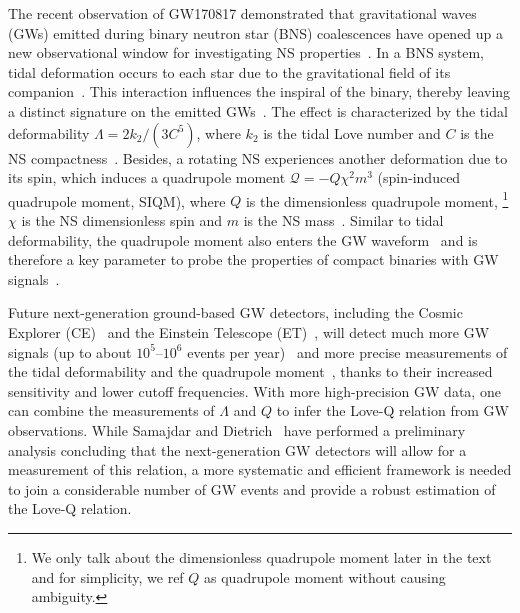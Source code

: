 \documentclass[a4paper,11pt]{article}
\begin{document}
The recent observation of GW170817 demonstrated that gravitational waves (GWs) emitted during binary neutron star (BNS) 
coalescences have opened up a new observational window for investigating NS properties~\cite{LIGOScientific:2017vwq, LIGOScientific:2018cki, LIGOScientific:2018hze}. 
In a BNS system, tidal deformation occurs to each star due to the gravitational field of its companion~\cite{Hinderer:2007mb, Damour:2009vw}. 
This interaction influences the inspiral of the binary, thereby leaving a distinct signature on the emitted GWs~\cite{Vines:2011ud, Favata:2013rwa, Wade:2014vqa, Baiotti:2019sew, Chatziioannou:2020pqz}.
The effect is characterized by the tidal deformability $\Lambda=2k_2/(3C^5)$, 
where $k_2$ is the tidal Love number and $C$ is the NS compactness~\cite{Flanagan:2007ix}. Besides, a rotating NS experiences another deformation due to its 
spin, which induces a quadrupole moment $\mathcal{Q}=-Q\chi^2 m^3$ (spin-induced quadrupole moment, SIQM), where $Q$ is the dimensionless quadrupole moment,
\footnote{We only talk about the dimensionless quadrupole moment later in the text and for simplicity, we ref $Q$ as quadrupole moment without causing ambiguity.} 
$\chi$ is the NS dimensionless spin and $m$ is the NS mass~\cite{Hartle:1968, Laarakkers:1997hb}. Similar to tidal deformability, the quadrupole moment also enters the 
GW waveform~\cite{Poisson:1997ha, Harry:2018hke, Samajdar:2019ulq, Abac:2023ujg} and is therefore a key parameter to probe the properties of compact binaries with GW signals~\cite{Agathos:2015uaa, Krishnendu:2017shb, Krishnendu:2019tjp, Lyu:2023zxv}. 

Future next-generation ground-based GW detectors, including the Cosmic Explorer (CE)~\cite{Reitze:2019iox, Reitze:2019dyk} and the Einstein Telescope (ET)~\cite{Punturo:2010zz, Hild:2010id, Sathyaprakash:2012jk}, 
will detect much more GW signals (up to about $10^5$--$10^6$ events per year)~\cite{LIGOScientific:2017zlf, Sathyaprakash:2019yqt, Kalogera:2021bya, Samajdar:2021egv} 
and more precise measurements of the tidal deformability and the quadrupole moment~\cite{Yagi:2013awa, Samajdar:2020xrd}, thanks to their increased sensitivity and lower cutoff frequencies. 
With more high-precision GW data, one can combine the measurements of $\Lambda$ and $Q$ to infer the Love-Q relation from GW observations. 
While Samajdar and Dietrich~\cite{Samajdar:2020xrd} have performed a preliminary analysis concluding that the next-generation GW detectors 
will allow for a measurement of this relation, a more systematic and efficient framework is needed to join a considerable number of GW events and provide a robust estimation of the Love-Q relation. 
\end{document}
